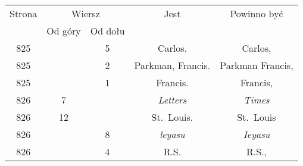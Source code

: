 \documentclass[a4paper,11pt]{article}
\begin{document}
\begin{center}
  \begin{tabular}{|c|c|c|c|c|}
    \hline
    Strona & \multicolumn{2}{c|}{Wiersz} & Jest
                              & Powinno być \\ \cline{2-3}
    & Od góry & Od dołu & & \\
    \hline
    825 & & \hphantom{0}5 & Carlos. & Carlos, \\
    825 & & \hphantom{0}2 & Parkman, Francis. & Parkman Francis, \\
    825 & & \hphantom{0}1 & Francis. & Francis, \\
    826 & \hphantom{0}7 & & \textit{Letters} & \textit{Times} \\
    826 & 12 & & St.~Louis. & St.~Louis \\
    826 & & \hphantom{0}8 & \textit{leyasu} & \textit{Ieyasu} \\
    826 & & \hphantom{0}4 & R.S. & R.S., \\
    \hline
  \end{tabular}

\end{center}
\end{document}
